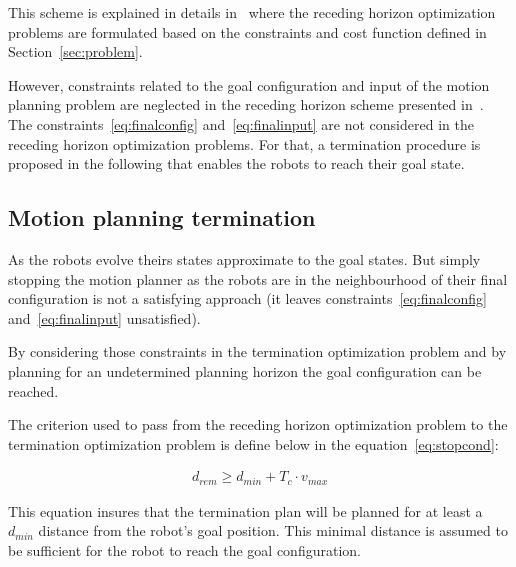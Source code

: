 \documentclass[eprint]{actapoly}
\begin{document}
\mbox{}

This scheme is explained in details in~\cite{Defoort2007a} where the receding horizon optimization
problems are formulated based on the constraints and cost function defined in Section~\ref{sec:problem}.

However, constraints related to the goal configuration and input of the motion planning problem are
neglected in the receding horizon scheme presented in~\cite{Defoort2007a}.
The constraints~\ref{eq:finalconfig} and~\ref{eq:finalinput} are not considered
in the receding horizon optimization problems.
For that, a termination procedure is proposed in the following that enables the robots to reach their
goal state.


\subsection{Motion planning termination}


As the robots evolve theirs states approximate to the goal states.
But simply stopping the motion planner as the robots are in the neighbourhood of
their final configuration is not a satisfying approach (it leaves 
constraints~\ref{eq:finalconfig} and~\ref{eq:finalinput} unsatisfied).


By considering those constraints in the termination optimization problem and by planning for
an undetermined planning horizon the goal configuration can be reached.


The criterion used to pass from the receding horizon optimization problem to the termination optimization problem
is define below in the equation~\ref{eq:stopcond}:

\begin{align}\label{eq:stopcond}
  d_{rem} \geq d_{min} + T_c \cdot v_{max}
\end{align}

This equation insures that the termination plan will be planned for at least a 
$d_{min}$ distance from the robot's goal position.
This minimal distance is assumed to be sufficient for the robot to reach the 
goal configuration.
\end{document}
